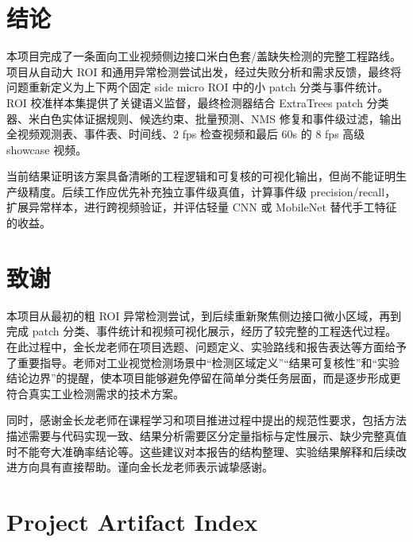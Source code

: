 \documentclass[a4paper,12pt]{article}
\begin{document}
\section{结论}
本项目完成了一条面向工业视频侧边接口米白色套/盖缺失检测的完整工程路线。项目从自动大 ROI 和通用异常检测尝试出发，经过失败分析和需求反馈，最终将问题重新定义为上下两个固定 side micro ROI 中的小 patch 分类与事件统计。ROI 校准样本集提供了关键语义监督，最终检测器结合 ExtraTrees patch 分类器、米白色实体证据规则、候选约束、批量预测、NMS 修复和事件级过滤，输出全视频观测表、事件表、时间线、$2$ fps 检查视频和最后 $60$s 的 $8$ fps 高级 showcase 视频。

当前结果证明该方案具备清晰的工程逻辑和可复核的可视化输出，但尚不能证明生产级精度。后续工作应优先补充独立事件级真值，计算事件级 precision/recall，扩展异常样本，进行跨视频验证，并评估轻量 CNN 或 MobileNet 替代手工特征的收益。

\section*{致谢}
本项目从最初的粗 ROI 异常检测尝试，到后续重新聚焦侧边接口微小区域，再到完成 patch 分类、事件统计和视频可视化展示，经历了较完整的工程迭代过程。在此过程中，金长龙老师在项目选题、问题定义、实验路线和报告表达等方面给予了重要指导。老师对工业视觉检测场景中“检测区域定义”“结果可复核性”和“实验结论边界”的提醒，使本项目能够避免停留在简单分类任务层面，而是逐步形成更符合真实工业检测需求的技术方案。

同时，感谢金长龙老师在课程学习和项目推进过程中提出的规范性要求，包括方法描述需要与代码实现一致、结果分析需要区分定量指标与定性展示、缺少完整真值时不能夸大准确率结论等。这些建议对本报告的结构整理、实验结果解释和后续改进方向具有直接帮助。谨向金长龙老师表示诚挚感谢。

\clearpage
\appendix
\section{Project Artifact Index}
\end{document}
